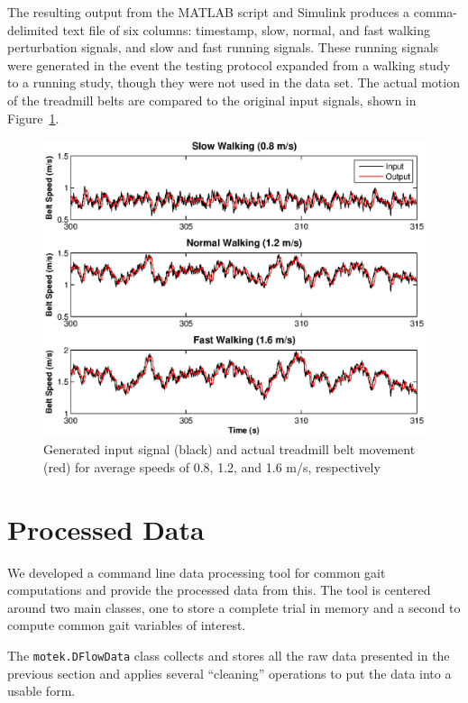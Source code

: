 \documentclass{article}
\begin{document}
The resulting output from the MATLAB script and Simulink produces a comma-
delimited text file of six columns: timestamp, slow, normal, and fast walking
perturbation signals, and slow and fast running signals.  These running signals
were generated in the event the testing protocol expanded from a walking study
to a running study, though they were not used in the data set.  The actual motion
of the treadmill belts are compared to the original input signals, shown in 
Figure~\ref{fig:input_output}.  

\begin{figure}
  \includegraphics{figures/input_vs_output.eps}
  \caption{Generated input signal (black) and actual treadmill belt movement
                (red) for average speeds of 0.8, 1.2, and 1.6 m/s, respectively}
  \label{fig:input_output}
\end{figure}

\section{Processed Data}

We developed a command line data processing tool for common gait computations
and provide the processed data from this. The tool is centered around two main
classes, one to store a complete trial in memory and a second to compute common
gait variables of interest.

The \verb|motek.DFlowData| class collects and stores all the raw data presented
in the previous section and applies several ``cleaning'' operations to put the
data into a usable form.
\end{document}

